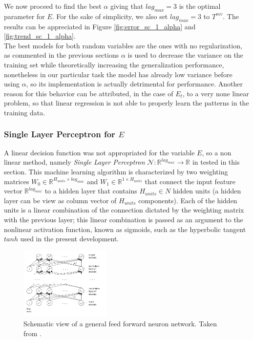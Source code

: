 We now proceed to find the best $\alpha$ giving that $lag_{max}=3$ is the optimal parameter for $E$. For the sake of simplicity, we also set $lag_{max}=3$ to $T^{mv}$. The results can be appreciated in Figure \ref{fig:error_sc_1_alpha} and \ref{fig:trend_sc_1_alpha}.\\ 

The best models for both random variables are the ones with no regularization, as commented in the previous sections $\alpha$ is used to decrease the variance on the training set while theoretically increasing the generalization performance, nonetheless in our particular task the model has already low variance before using $\alpha$, so its implementation is actually detrimental for performance. Another reason for this behavior can be attributed, in the case of $E_{t}$, to a very none linear problem, so that linear regression is not able to properly learn the patterns in the training data. \\



\subsubsection{Single Layer Perceptron for $E$}

A linear decision function was not appropriated for the variable $E$, so a non linear method, namely \emph{Single Layer Perceptron}  $\mathcal{N}:\mathbb{R}^{lag_{max}} \rightarrow \mathbb{R}$ in tested in this section. This machine learning algorithm is characterized by two weighting matrices $W_{0} \in \mathbb{R}^{H_{units}\times lag_{max}} $ and $W_{1} \in \mathbb{R}^{1 \times H_{units}}$ that connect the input feature vector $\mathbb{R}^{lag_{max}}$ to a hidden layer that contains $H_{units} \in N$ hidden units (a hidden layer can be view as column vector of $H_{units}$ components). Each of the hidden units is a linear combination of the connection dictated by the weighting matrix with the previous layer; this linear combination is passed as an argument to the nonlinear activation function, known as sigmoids, such as the hyperbolic tangent $tanh$ used in the present development. 

\begin{figure}[htpb!] %
	\centering %
	\includegraphics[width=0.4\textwidth]{notebooks/data/nn.png} %
	\caption{Schematic view of a general feed forward neuron network. Taken from  \cite{ml_jacobs_h}.} %
	\label{fig:nn} %
\end{figure}

